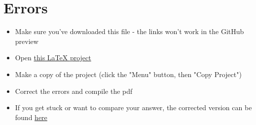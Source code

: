 \documentclass[11pt,a4paper]{article}
\begin{document}
\section{Errors}\label{sec:errors}
\begin{itemize}
\item Make sure you've downloaded this file - the links won't work in the GitHub preview
\item Open \href{https://www.overleaf.com/read/gnzphcnqgfvf}{this LaTeX project}
\item Make a copy of the project (click the "Menu" button, then "Copy Project")
\item Correct the errors and compile the pdf
\item If you get stuck or want to compare your answer, the corrected version can be found \href{https://www.overleaf.com/read/zsmyvxvdcvfr}{here}
\end{itemize}
\end{document}
